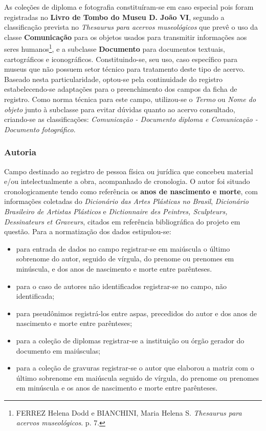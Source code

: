 As coleções de diploma e fotografia constituíram-se em caso especial pois foram registradas no \textbf{Livro de Tombo do Museu D. João VI}, segundo a classificação prevista no \textit{Thesaurus para acervos museológicos} que prevê o uso da classe \textbf{Comunicação} para os objetos usados para transmitir informações aos seres humanos\footnote{FERREZ Helena Dodd e BIANCHINI, Maria Helena S. \textit{Thesaurus para acervos museológicos}. p. 7.}, e a subclasse \textbf{Documento} para documentos textuais, cartográficos e iconográficos. Constituindo-se, seu uso, caso específico para museus que não possuem setor técnico para tratamento deste tipo de acervo. Baseado nesta particularidade, optou-se pela continuidade do registro estabelecendo-se adaptações para o preenchimento dos campos da ficha de registro. Como norma técnica para este campo, utilizou-se o \textit{Termo} ou \textit{Nome do objeto} junto à subclasse para evitar dúvidas quanto ao acervo consultado, criando-se as classificações: \textit{Comunicação - Documento diploma e Comunicação - Documento fotográfico}.


\subsubsection{Autoria}
Campo destinado ao registro de pessoa física ou jurídica que concebeu material e/ou intelectualmente a obra, acompanhado de cronologia. O autor foi situado cronologicamente tendo como referência os \textbf{anos de nascimento e morte}, com informações coletadas do \textit{Dicionário das Artes Plásticas no Brasil}, \textit{Dicionário Brasileiro de Artistas Plásticos} e \textit{Dictionnaire des Peintres, Sculpteurs, Dessinateurs et Graveurs}, citados em referência bibliográfica do projeto em questão. Para a normatização dos dados estipulou-se:

\begin{itemize}
	\item para entrada de dados no campo registrar-se em maiúscula o último sobrenome do autor, seguido de vírgula, do prenome ou prenomes em minúscula, e dos anos de nascimento e morte entre parênteses.
	\item para o caso de autores não identificados registrar-se no campo, não identificada;
	\item para pseudônimos registrá-los entre aspas, precedidos do autor e dos anos de nascimento e morte entre parênteses;
	\item para a coleção de diplomas registrar-se a instituição ou órgão gerador do documento em maiúsculas;
	\item para a coleção de gravuras registrar-se o autor que elaborou a matriz com o último sobrenome em maiúscula seguido de vírgula, do prenome ou prenomes em minúscula e os anos de nascimento e morte entre parênteses.
\end{itemize}

